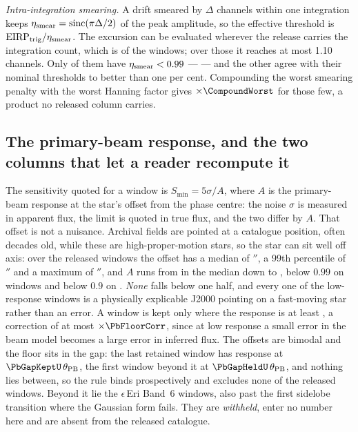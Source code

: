 \emph{Intra-integration smearing.} A drift smeared by $\Delta$ channels within
one integration keeps $\eta_{\rm smear}=\mathrm{sinc}(\pi\Delta/2)$ of the peak
amplitude, so the effective threshold is
$\mathrm{EIRP}_{\rm trig}/\eta_{\rm smear}$. The excursion can be evaluated
wherever the release carries the integration count, which is \CsNDumpWin{} of
the \NWindows{} windows; over those it reaches at most 1.10 channels. Only
\NSmearLo{} of them have $\eta_{\rm smear}<0.99$ --- \SmearList{} --- and the
other \NSmearOk{} agree with their nominal thresholds to better than one per
cent. Compounding
the worst smearing penalty with the worst Hanning factor gives
$\times\CompoundWorst$ for those few, a product no released column carries.

\subsection{The primary-beam response, and the two columns that let a reader
recompute it}

The sensitivity quoted for a window is $S_{\min}=5\sigma/A$, where $A$ is the
primary-beam response at the star's offset from the phase centre: the noise
$\sigma$ is measured in apparent flux, the limit is quoted in true flux, and
the two differ by $A$. That offset is not a nuisance. Archival fields are
pointed at a catalogue position, often decades old, while these are
high-proper-motion stars, so the star can sit well off axis: over the
\PbNWin{} released windows the offset has a median of \PbOffMed$''$, a 99th
percentile of \PbOffPNN$''$ and a maximum of \PbOffMax$''$, and $A$ runs from
\PbAMed{} in the median down to \PbAMin, below $0.99$ on \PbNLowNN{} windows
and below $0.9$ on \PbNLowN. \emph{None} falls below one half, and every one
of the low-response windows is a physically explicable J2000 pointing on a
fast-moving star rather than an error. A window is kept only where the
response is at least \PbFloorResp, a correction of at most
$\times\PbFloorCorr$, since at low response a small error in the beam model
becomes a large error in inferred flux. The offsets are bimodal and the floor
sits in the gap: the last retained window has response \PbGapKeptResp{} at
$\PbGapKeptU\,\theta_{\rm PB}$, the first window beyond it \PbGapHeldResp{}
at $\PbGapHeldU\,\theta_{\rm PB}$, and nothing lies between, so the rule
binds prospectively and excludes none of the \NWindows{} released windows.
Beyond it lie the \EpsEriNWin{} $\epsilon$\,Eri Band~6 windows, also past the
first sidelobe transition where the Gaussian form fails. They are
\emph{withheld}, enter no number here and are absent from the released
catalogue.


